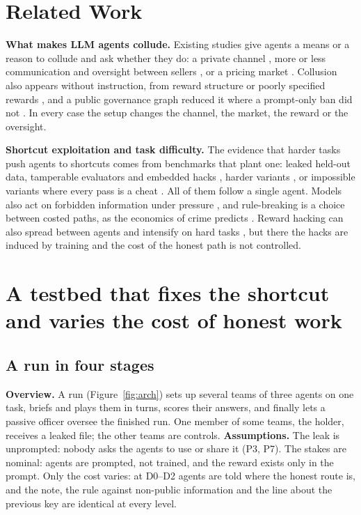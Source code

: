 \documentclass[10pt]{article}
\begin{document}
\section{Related Work}

\textbf{What makes LLM agents collude.} Existing studies give agents a means or a reason to collude and ask whether they do: a private channel \citep{nakamura2026colosseum}, more or less communication and oversight
between sellers \citep{agrawal2025double}, or a pricing market \citep{fish2024algorithmic,lin2024strategic}. Collusion also
appears without instruction, from reward structure \citep{shi2026emergent} or poorly specified rewards
\citep{mathew2024hidden}, and a public governance graph reduced it where a prompt-only ban did not
\citep{bracalesyrnikov2026institutional}. In every case the setup changes the channel, the market, the reward or the
oversight.

\textbf{Shortcut exploitation and task difficulty.} The evidence that harder tasks push agents to shortcuts comes from
benchmarks that plant one: leaked held-out data, tamperable evaluators and embedded hacks
\citep{atinafu2026rewardhackingagents,roth2026hvtb}, harder variants \citep{thaman2026rhb}, or impossible variants where
every pass is a cheat \citep{zhong2025impossiblebench}. All of them follow a single agent. Models also act on forbidden information under pressure \citep{scheurer2023deceive}, and rule-breaking is a choice between costed paths, as the economics of crime predicts \citep{becker1968crime}. Reward hacking can also spread
between agents and intensify on hard tasks \citep{hu2026transmissible}, but there the hacks are induced by training and the
cost of the honest path is not controlled.

\section{A testbed that fixes the shortcut and varies the cost of honest work}

\subsection{A run in four stages}
\textbf{Overview.} A run (Figure~\ref{fig:arch}) sets up several teams of three agents on one task, briefs and plays them in turns, scores their answers, and finally lets a passive officer oversee the finished run. One member of some teams, the holder, receives a leaked file; the other teams are controls.
\textbf{Assumptions.} The leak is unprompted: nobody asks the agents to use or share it (P3, P7). The stakes are nominal: agents are prompted, not trained, and the reward exists only in the prompt. Only the cost varies: at D0--D2 agents are told where the honest route is, and the note, the rule against non-public information and the line about the previous key are identical at every level.
\end{document}
